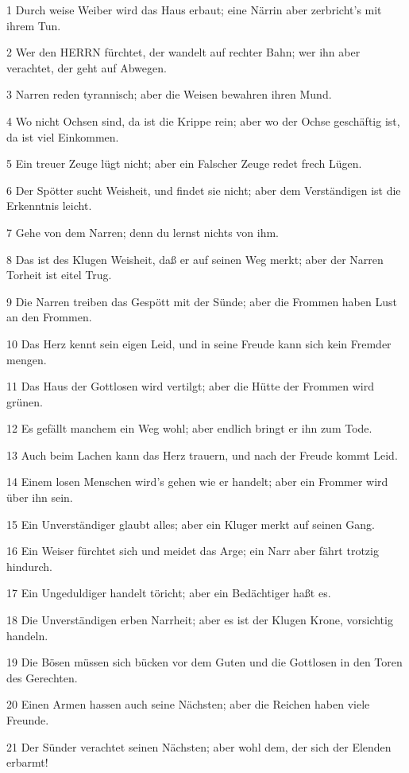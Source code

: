 \par 1 Durch weise Weiber wird das Haus erbaut; eine Närrin aber zerbricht's mit ihrem Tun.
\par 2 Wer den HERRN fürchtet, der wandelt auf rechter Bahn; wer ihn aber verachtet, der geht auf Abwegen.
\par 3 Narren reden tyrannisch; aber die Weisen bewahren ihren Mund.
\par 4 Wo nicht Ochsen sind, da ist die Krippe rein; aber wo der Ochse geschäftig ist, da ist viel Einkommen.
\par 5 Ein treuer Zeuge lügt nicht; aber ein Falscher Zeuge redet frech Lügen.
\par 6 Der Spötter sucht Weisheit, und findet sie nicht; aber dem Verständigen ist die Erkenntnis leicht.
\par 7 Gehe von dem Narren; denn du lernst nichts von ihm.
\par 8 Das ist des Klugen Weisheit, daß er auf seinen Weg merkt; aber der Narren Torheit ist eitel Trug.
\par 9 Die Narren treiben das Gespött mit der Sünde; aber die Frommen haben Lust an den Frommen.
\par 10 Das Herz kennt sein eigen Leid, und in seine Freude kann sich kein Fremder mengen.
\par 11 Das Haus der Gottlosen wird vertilgt; aber die Hütte der Frommen wird grünen.
\par 12 Es gefällt manchem ein Weg wohl; aber endlich bringt er ihn zum Tode.
\par 13 Auch beim Lachen kann das Herz trauern, und nach der Freude kommt Leid.
\par 14 Einem losen Menschen wird's gehen wie er handelt; aber ein Frommer wird über ihn sein.
\par 15 Ein Unverständiger glaubt alles; aber ein Kluger merkt auf seinen Gang.
\par 16 Ein Weiser fürchtet sich und meidet das Arge; ein Narr aber fährt trotzig hindurch.
\par 17 Ein Ungeduldiger handelt töricht; aber ein Bedächtiger haßt es.
\par 18 Die Unverständigen erben Narrheit; aber es ist der Klugen Krone, vorsichtig handeln.
\par 19 Die Bösen müssen sich bücken vor dem Guten und die Gottlosen in den Toren des Gerechten.
\par 20 Einen Armen hassen auch seine Nächsten; aber die Reichen haben viele Freunde.
\par 21 Der Sünder verachtet seinen Nächsten; aber wohl dem, der sich der Elenden erbarmt!
